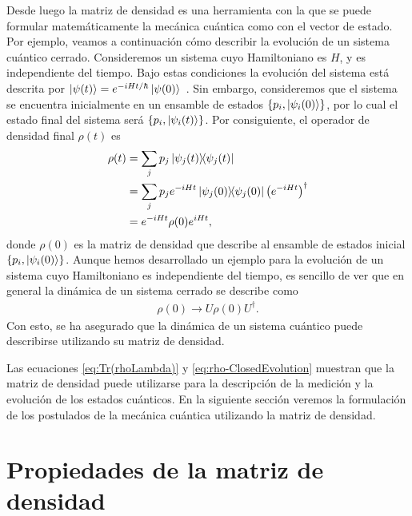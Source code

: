 Desde luego la matriz de densidad es una herramienta con la que
se puede formular matemáticamente la mecánica cuántica como 
con el vector de estado. Por ejemplo, veamos a continuación cómo 
describir la evolución de un sistema cuántico cerrado.
Consideremos un sistema cuyo Hamiltoniano es $H$, y es
independiente del tiempo. Bajo estas condiciones la evolución
del sistema está descrita por 
$\ket{\psi (t)}=e^{-iHt/\hbar}\ket{\psi(0)}$~\cite{sakurai2010modern}. 
Sin embargo, consideremos que el sistema se encuentra inicialmente
en un ensamble de estados $\{p_i, \ket{\psi_i(0)}\}$, por lo cual
el estado final del sistema será 
$\{p_i, \ket{\psi_i(t)}\}$.
Por consiguiente, el operador de densidad final $\rho(t)$  es 
\begin{align} \label{eq:Rho-evolution-H}
	\rho(t) &= \sum_j p_j\dyad{\psi_j(t)}{\psi_j(t)}\nonumber\\
	&= \sum_j p_j e^{-iHt} \dyad{\psi_j(0)}{\psi_j(0)}\qty(e^{-iHt})^{\dagger}
	\nonumber\\
	&= e^{-iHt}\rho(0)e^{iHt},
\end{align}
donde $\rho(0)$ es la matriz de densidad que describe al ensamble 
de estados inicial $\{p_i, \ket{\psi_i(0)}\}$.	 Aunque hemos desarrollado 
un ejemplo para la evolución de un sistema cuyo Hamiltoniano es 
independiente del tiempo, es sencillo de ver que en general la dinámica  
de un sistema cerrado se describe como 
\begin{align}\label{eq:rho-ClosedEvolution}
\rho(0) \longrightarrow U\rho(0)U^{\dagger}.
\end{align}
Con esto, se ha asegurado que la dinámica de un sistema cuántico puede 
describirse utilizando su matriz de densidad.

Las ecuaciones \eqref{eq:Tr(rhoLambda)} y \eqref{eq:rho-ClosedEvolution}
muestran que la matriz de densidad puede utilizarse para la descripción 
de la medición y la evolución de los estados cuánticos. 
En la siguiente sección veremos la formulación de los postulados 
de la mecánica cuántica utilizando la matriz de densidad.

\section{Propiedades de la matriz de densidad}
\label{sec:density-matrices-properties}



